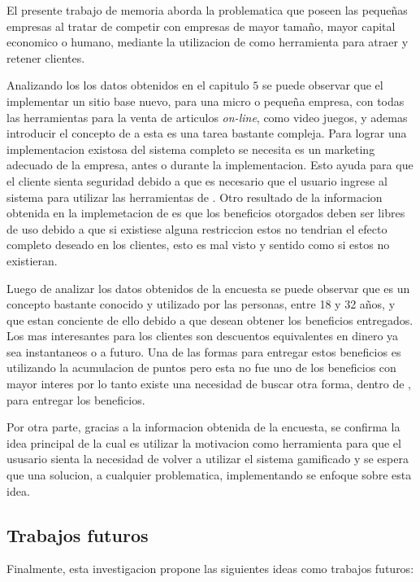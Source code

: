 El presente trabajo de memoria aborda la problematica que poseen las pequeñas empresas al tratar
de competir con empresas de mayor tamaño, mayor capital economico o humano, mediante la utilizacion
de {\GAM} como herramienta para atraer y retener clientes.

Analizando los los datos obtenidos en el capitulo $5$ se puede observar que el implementar un sitio base 
nuevo, para una micro o pequeña empresa, con todas las herramientas para la venta de articulos \emph{on-line}, 
como video juegos, y ademas introducir el concepto de {\GAM} a esta es una tarea bastante compleja. 
Para lograr una implementacion existosa del sistema completo se necesita es un marketing adecuado 
de la empresa, antes o durante la implementacion. Esto ayuda para que el cliente sienta seguridad
debido a que es necesario que el usuario ingrese al sistema para utilizar las herramientas de {\GAM}.
Otro resultado de la informacion obtenida en la implemetacion de {\GAM} es que los beneficios otorgados
deben ser libres de uso debido a que si existiese alguna restriccion estos no tendrian el efecto completo
deseado en los clientes, esto es mal visto y sentido como si estos no existieran.     

Luego de analizar los datos obtenidos de la encuesta se puede observar que {\GAM} es un concepto bastante
conocido y utilizado por las personas, entre 18 y 32 años, y que estan conciente de ello debido a que
desean obtener los beneficios entregados. Los mas interesantes para los clientes son descuentos equivalentes
en dinero ya sea instantaneos o a futuro. Una de las formas para entregar estos beneficios es utilizando la 
acumulacion de puntos pero esta no fue uno de los beneficios con mayor interes por lo tanto existe una
necesidad de buscar otra forma, dentro de {\GAM}, para entregar los beneficios.

Por otra parte, gracias a la informacion obtenida de la encuesta, se confirma la idea principal de {\GAM} la
cual es utilizar la motivacion como herramienta para que el ususario sienta la necesidad de volver
a utilizar el sistema gamificado y se espera que una solucion, a cualquier problematica, implementando 
{\GAM} se enfoque sobre esta idea.

\subsection{Trabajos futuros}
Finalmente, esta investigacion propone las siguientes ideas como trabajos futuros:

